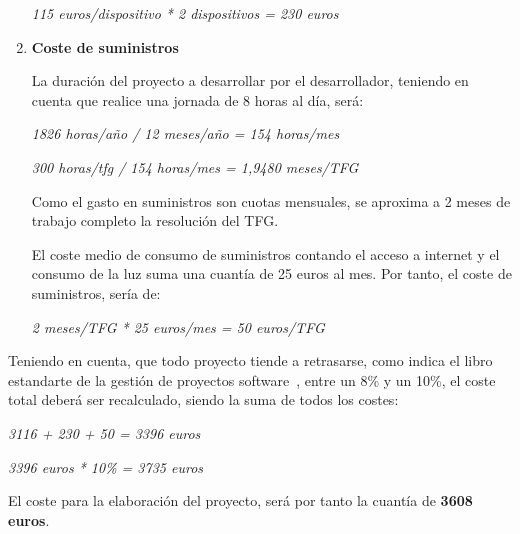 \begin{enumerate}
\begin{center}
    \textit{115 euros/dispositivo * 2 dispositivos = 230 euros}
\end{center}

    \item \textbf{Coste de suministros}
    
    La duración del proyecto a desarrollar por el desarrollador, teniendo en cuenta que realice una jornada de 8 horas al día, será:
    
\begin{center}
    \textit{1826 horas/año / 12 meses/año = 154 horas/mes}
    
    \textit{300 horas/tfg / 154 horas/mes = 1,9480 meses/TFG}
\end{center}

    Como el gasto en suministros son cuotas mensuales, se aproxima a 2 meses de trabajo completo la resolución del TFG.
    
    El coste medio de consumo de suministros contando el acceso a internet y el consumo de la luz suma una cuantía de 25 euros al mes. Por tanto, el coste de suministros, sería de:
\begin{center}
    \textit{2 meses/TFG * 25 euros/mes = 50 euros/TFG}
\end{center}
    
\end{enumerate}

Teniendo en cuenta, que todo proyecto tiende a retrasarse, como indica el libro estandarte de la gestión de proyectos software~\cite{spm}, entre un 8\% y un 10\%, el coste total deberá ser recalculado, siendo la suma de todos los costes:

\begin{center}
    \textit{3116 + 230 + 50 = 3396 euros}
    
    \textit{3396 euros * 10\%  = 3735 euros}
\end{center}

El coste para la elaboración del proyecto, será por tanto la cuantía de \textbf{3608 euros}.